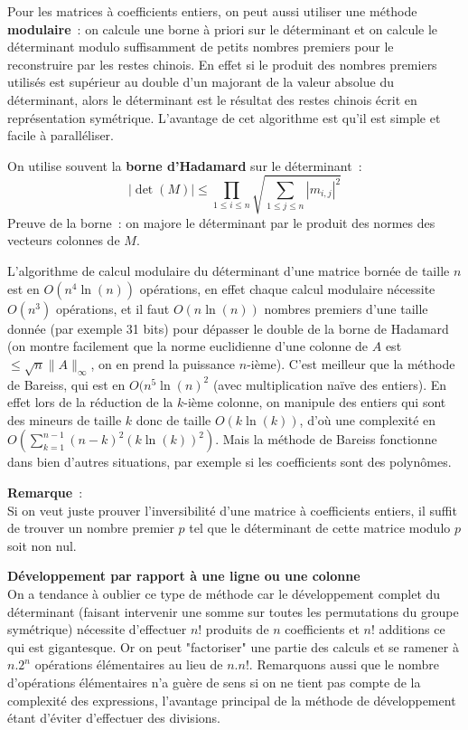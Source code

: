 \documentclass[a4paper,11pt]{book}
\begin{document}
\begin{giacjshere}
Pour les matrices \`a coefficients entiers, on peut aussi utiliser une
m\'ethode 
{\bf modulaire}~:
on calcule une borne \`a priori sur le d\'eterminant
et on calcule le d\'eterminant modulo suffisamment de petits nombres
premiers pour le reconstruire par les restes chinois. En effet
si le produit des nombres premiers utilisés
est supérieur au double d'un majorant de la valeur absolue du
déterminant, alors le déterminant est le résultat des restes chinois
écrit en représentation symétrique.
L'avantage de cet algorithme est qu'il est simple et facile à paralléliser.

On utilise souvent la {\bf borne d'Hadamard} 
sur le d\'eterminant~:
\[ |\det(M)| \leq \prod_{1\leq i \leq n} 
\sqrt{\sum_{1\leq j \leq n} |m_{i,j}|^2}\]
Preuve de la borne~: on majore le déterminant par le produit des
normes des vecteurs colonnes de $M$.

L'algorithme de calcul modulaire du déterminant d'une matrice bornée
de taille $n$ est en $O(n^4 \ln(n))$ opérations, en effet 
chaque calcul modulaire
nécessite $O(n^3)$ opérations, et il faut $O(n\ln(n))$ nombres premiers
d'une taille donnée (par exemple 31 bits)
pour dépasser le double de la borne de Hadamard 
(on montre facilement que la norme
euclidienne d'une colonne de $A$ est $\leq \sqrt{n}\|A\|_\infty$,
on en prend la puissance $n$-ième).
C'est meilleur que la méthode de Bareiss, qui est en 
$O(n^5 \ln(n)^2$ (avec multiplication naïve des entiers). En effet
lors de la réduction de la $k$-ième colonne, on manipule des entiers
qui sont des mineurs de taille $k$ donc de taille $O(k\ln(k))$, d'où
une complexité en $O(\sum_{k=1}^{n-1} (n-k)^2 (k\ln(k))^2 )$. Mais
la méthode de Bareiss fonctionne dans bien d'autres situations, par
exemple si les coefficients sont des polynômes.

{\bf Remarque}~:\\
Si on veut juste prouver l'inversibilité d'une matrice \`a coefficients
entiers, il suffit
de trouver un nombre premier $p$ tel que le déterminant de cette matrice modulo
$p$ soit non nul.

{\bf Développement par rapport à une ligne ou une colonne}\\
On a tendance à oublier ce type de méthode car le développement
complet du déterminant (faisant intervenir une somme sur toutes les
permutations du groupe symétrique)
nécessite d'effectuer $n!$ produits
de $n$ coefficients et $n!$ additions ce qui est gigantesque. Or on peut
"factoriser" une partie des calculs et se ramener à $n.2^n$ opérations
élémentaires au lieu de $n.n!$. Remarquons aussi que le nombre
d'opérations élémentaires n'a guère de sens si on ne tient pas
compte de la complexité des expressions, l'avantage principal
de la méthode de développement étant d'éviter d'effectuer
des divisions.


\end{giacjshere}
\end{document}
